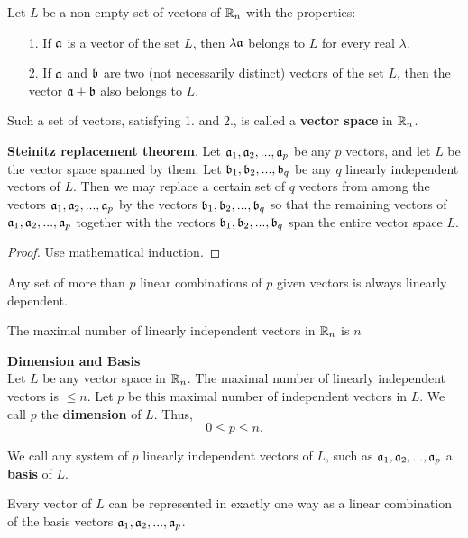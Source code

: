 Let $L$ be a {\elevenit non-empty} set of vectors of $\mathbb{R}_n$ with the properties:
\begin{itemize}
\item[1.] If $\mathfrak{a}$ is a vector of the set $L$, then $\lambda \mathfrak{a}$ belongs to $L$ for every real $\lambda$.
\item[2.] If $\mathfrak{a}$ and $\mathfrak{b}$ are two (not necessarily distinct) vectors of the set $L$, then the vector $\mathfrak{a} +\mathfrak{b}$ also belongs to $L$.
\end{itemize}
Such a set of vectors, satisfying 1. and 2., is  called a {\bf vector space} in $\mathbb{R}_n$.

\begin{theorem} {\bf Steinitz replacement theorem}. Let $\mathfrak{a}_1, \mathfrak{a}_2, ..., \mathfrak{a}_p$ be any $p$ vectors, and let $L$ be the vector space spanned by them. Let $\mathfrak{b}_1, \mathfrak{b}_2, ..., \mathfrak{b}_q$ be any $q$ linearly independent vectors of 
$L$. Then we may replace a certain set of $q$ vectors from among the vectors $\mathfrak{a}_1, \mathfrak{a}_2, ..., \mathfrak{a}_p$ by the vectors $\mathfrak{b}_1, \mathfrak{b}_2, ...,\mathfrak{b}_q$ so that the remaining vectors of $\mathfrak{a}_1, \mathfrak{a}_2, ..., \mathfrak{a}_p$ together with the vectors $\mathfrak{b}_1, \mathfrak{b}_2, ..., \mathfrak{b}_q$ span the entire vector space $L$.\label{Th2_1}
\end{theorem}

\begin{proof}
Use mathematical induction.
\end{proof}

\begin{theorem}
Any set of more than $p$ linear combinations of $p$ given vectors is always linearly dependent.\label{Th2_2}
\end{theorem}

\begin{theorem}
The maximal number of linearly independent vectors in $\mathbb{R}_n$ is $n$\label{Th2_3}
\end{theorem}

\begin{definition}{\bf Dimension and Basis}\\
Let $L$ be any vector space in $\mathbb{R}_n$. The maximal number of linearly independent vectors is $\le n$. Let $p$ be this maximal number of independent vectors in $L$. We call $p$ the {\bf dimension} of $L$. Thus,
$$0 \le p \le n.$$

We call any system of $p$ linearly independent vectors of $L$, such as $\mathfrak{a}_1, \mathfrak{a}_2, ..., \mathfrak{a}_p$ a {\bf basis} of $L$.
\end{definition}

\begin{theorem}
Every vector of $L$ can be represented in exactly one way as a linear combination of the basis vectors $\mathfrak{a}_1, \mathfrak{a}_2, ..., \mathfrak{a}_p$.\label{Th2_4}
\end{theorem}


